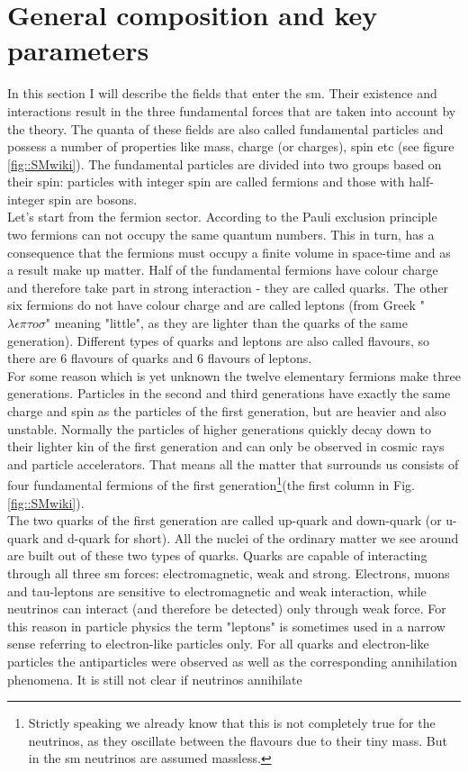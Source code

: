  \section{General composition and key parameters}
 \label{sec::sm_gen}
	In this section I will describe the fields that enter the \gls{sm}. Their existence and interactions result in the three fundamental forces that are taken into account by the theory. The quanta of these fields are also called fundamental particles and possess a number of properties like mass, charge (or charges), spin etc (see figure \ref{fig::SMwiki}). The fundamental particles are divided into two groups based on their spin: particles with integer spin are called fermions and those with half-integer spin are bosons. \\
	Let's start from the fermion sector. According to the Pauli exclusion principle\cite{pep} two fermions can not occupy the same quantum numbers. This in turn, has a consequence that the fermions must occupy a finite volume in space-time and as a result make up matter. Half of the fundamental fermions have colour charge and therefore take part in strong interaction - they are called quarks. The other six fermions do not have colour charge and are called leptons (from Greek "$\lambda \epsilon \pi \tau o \sigma$" meaning "little", as they are lighter than the quarks of the same generation). Different types of quarks and leptons are also called flavours, so there are 6 flavours of quarks and 6 flavours of leptons.\\
	For some reason which is yet unknown the twelve elementary fermions make three generations. Particles in the second and third generations have exactly the same charge and spin as the particles of the first generation, but are heavier and also unstable.  Normally the particles of higher generations quickly decay down to their lighter kin of the first generation and can only be observed in cosmic rays and particle accelerators. That means all the matter that surrounds us consists of four fundamental fermions of the first generation\footnote{Strictly speaking we already know that this is not completely true for the neutrinos, as they oscillate between the flavours due to their tiny mass. But in the \gls{sm} neutrinos are assumed massless.}(the first column in Fig. \ref{fig::SMwiki}).\\
	The two quarks of the first generation are called up-quark and down-quark (or u-quark and d-quark for short). All the nuclei of the ordinary matter we see around are built out of these two types of quarks. Quarks are capable of interacting through all three \gls{sm} forces: electromagnetic, weak and strong. Electrons, muons and tau-leptons are sensitive to electromagnetic and weak interaction, while neutrinos can interact (and therefore be detected) only through weak force. For this reason in particle physics the term "leptons" is sometimes used in a narrow sense referring to electron-like particles only. For all quarks and electron-like particles the antiparticles were observed as well as the corresponding annihilation phenomena. It is still not clear if neutrinos annihilate\\

